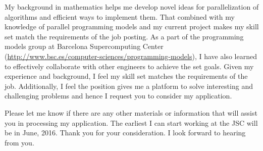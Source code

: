 \documentclass[10pt,stdletter,dateno]{newlfm}
\begin{document}
\begin{newlfm}
%
\par
	   My background in mathematics helps me develop novel ideas for parallelization of algorithms and efficient ways to implement them. 
	   That combined with my knowledge of parallel programming models and my current project makes my skill set match the requirements of the job posting.
	   As a part of the programming models group at Barcelona Supercomputing Center (\url{http://www.bsc.es/computer-sciences/programming-models}), I have also learned to effectively collaborate with other engineers to achieve the set goals. 
	   Given my experience and background, I feel my skill set matches the requirements of the job. 
	   Additionally, I feel the position gives me a platform to solve interesting and challenging problems and hence I request you to consider my application. 
%
\par
Please let me know if there are any other materials or information that will assist you in processing my application. 
The earliest I can start working at the JSC will be in June, 2016. 
Thank you for your consideration. I look forward to hearing from you.
%
%
\end{newlfm}
\end{document}
